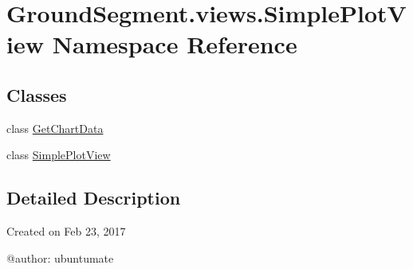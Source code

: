 \hypertarget{namespace_ground_segment_1_1views_1_1_simple_plot_view}{}\section{Ground\+Segment.\+views.\+Simple\+Plot\+View Namespace Reference}
\label{namespace_ground_segment_1_1views_1_1_simple_plot_view}
\subsection*{Classes}
\begin{DoxyCompactItemize}
\item 
class \hyperlink{class_ground_segment_1_1views_1_1_simple_plot_view_1_1_get_chart_data}{Get\+Chart\+Data}
\item 
class \hyperlink{class_ground_segment_1_1views_1_1_simple_plot_view_1_1_simple_plot_view}{Simple\+Plot\+View}
\end{DoxyCompactItemize}


\subsection{Detailed Description}
\begin{DoxyVerb}Created on Feb 23, 2017

@author: ubuntumate
\end{DoxyVerb}
 